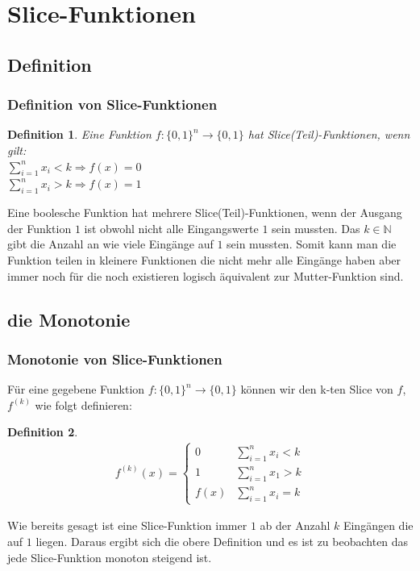 \documentclass[hyperref={pdfpagelabels=false}]{beamer} %
\newtheorem{defin}{Definition}
\begin{document}
  \section{Slice-Funktionen}
  \subsection*{Definition}
  \begin{frame}%
    \frametitle{Definition von Slice-Funktionen}
    \begin{defin}
      Eine Funktion $f:\{0,1\}^n \rightarrow \{0,1\}$ hat Slice(Teil)-Funktionen, wenn gilt:\\
      $\sum_{i=1}^{n} x_i<k\Rightarrow f(x)=0$\\
      $\sum_{i=1}^{n} x_i>k\Rightarrow f(x)=1$\\
    \end{defin}
    Eine boolesche Funktion hat mehrere Slice(Teil)-Funktionen, wenn der Ausgang der Funktion $1$ ist obwohl nicht alle Eingangswerte $1$ sein mussten.
    Das $k \in \mathbb{N}$ gibt die Anzahl an wie viele Eing\"ange auf $1$ sein mussten.
    Somit kann man die Funktion teilen in kleinere Funktionen die nicht mehr alle Eing\"ange haben aber immer noch f\"ur die noch existieren logisch \"aquivalent zur Mutter-Funktion sind.
  \end{frame}

  \subsection*{die Monotonie}
  \begin{frame}
    \frametitle{Monotonie von Slice-Funktionen}
    Für eine gegebene Funktion $f:\{0,1\}^n \rightarrow \{0,1\}$ können wir den k-ten Slice von $f$,
    $f^{(k)}$ wie folgt definieren:\\
    \begin{defin}
      \begin{align*}
        f^{(k)}(x) =
        \begin{cases}
          0 & \sum\nolimits_{i=1}^{n} x_i < k\\
          1 & \sum\nolimits_{i=1}^{n} x_1 > k\\
          f(x) & \sum\nolimits_{i=1}^{n} x_i = k %
        \end{cases}
      \end{align*}
    \end{defin}
    Wie bereits gesagt ist eine Slice-Funktion immer $1$ ab der Anzahl $k$ Eing\"angen die auf $1$ liegen.
    Daraus ergibt sich die obere Definition und es ist zu beobachten das jede Slice-Funktion monoton steigend ist.
  \end{frame}
\end{document}
